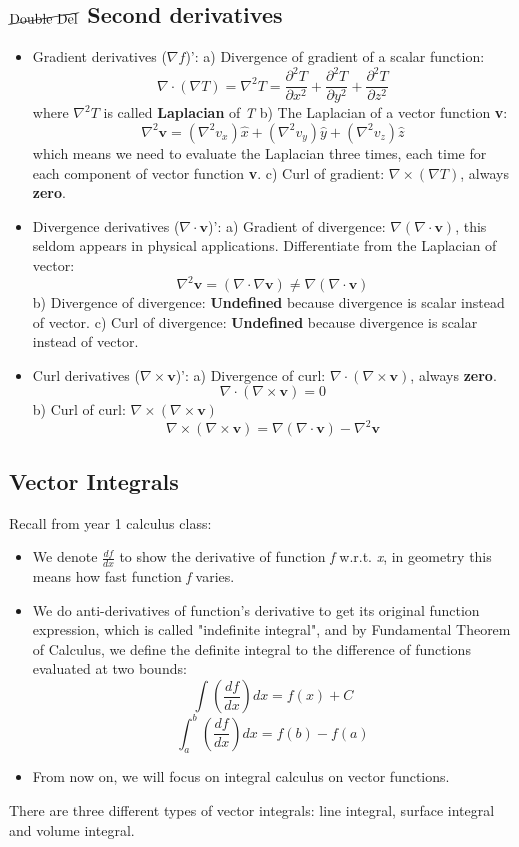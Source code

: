 \documentclass[12pt,a4paper,twoside]{article}
\begin{document}
	\subsection{$\cancel{\textrm{Double Del}}$ Second derivatives}
	\begin{itemize}
		\item Gradient derivatives (\(\nabla f\))':
		\subitem a) Divergence of gradient of a scalar function:
		\[\nabla \cdot (\nabla T)=\nabla^2T = \frac{\partial ^2T}{\partial x^2}+\frac{\partial^2 T}{\partial y^2}+\frac{\partial^2 T}{\partial z^2}\]
		where \(\nabla^2 T\) is called \textbf{Laplacian} of \textit{T}
		\subitem b) The Laplacian of a vector function \textbf{v}:
		\[\nabla^2\textbf{v}=(\nabla^2 v_x)\hat{x}+(\nabla^2 v_y)\hat{y}+(\nabla^2 v_z)\hat{z}\]
		which means we need to evaluate the Laplacian three times, each time for each component of vector function \textbf{v}.
		\subitem c) Curl of gradient: \(\nabla\times (\nabla T)\), always \textbf{zero}.
		\item Divergence derivatives (\(\nabla \cdot \textbf{v}\))':
		\subitem a) Gradient of divergence: \(\nabla(\nabla\cdot \textbf{v})\), this seldom appears in physical applications. Differentiate from the Laplacian of vector:
		\[\nabla^2 \textbf{v}=(\nabla \cdot \nabla \textbf{v})\neq\nabla(\nabla \cdot \textbf{v})\]
		\subitem b) Divergence of divergence: \textbf{Undefined} because divergence is scalar instead of vector.
		\subitem c) Curl of divergence: \textbf{Undefined} because divergence is scalar instead of vector.
		\item Curl derivatives (\(\nabla \times \textbf{v}\))':
		\subitem a) Divergence of curl: \(\nabla \cdot (\nabla \times \textbf{v})\), always \textbf{zero}.
		\[\nabla \cdot (\nabla \times \textbf{v})=0\]
		\subitem b) Curl of curl: \(\nabla \times(\nabla\times \textbf{v})\)
		\[\nabla \times(\nabla\times \textbf{v})=\nabla(\nabla \cdot \textbf{v})-\nabla^2\textbf{v}\]
	\end{itemize}
	
	
	\subsection{Vector Integrals}
	Recall from year 1 calculus class:
	\begin{itemize}
		\item We denote \(\frac{df}{dx}\) to show the derivative of function \textit{f} w.r.t. \textit{x}, in geometry this means how fast function \textit{f} varies.
		\item We do anti-derivatives of function's derivative to get its original function expression, which is called "indefinite integral", and by Fundamental Theorem of Calculus, we define the definite integral to the difference of functions evaluated at two bounds:
		\[\int \left(\frac{df}{dx}\right)dx=f(x)+C\]
		\[\int_{a}^{b}\left(\frac{df}{dx}\right)dx=f(b)-f(a)\]
		\item From now on, we will focus on integral calculus on vector functions.
	\end{itemize}
	There are three different types of vector integrals: line integral, surface integral and volume integral.
	
\end{document}
